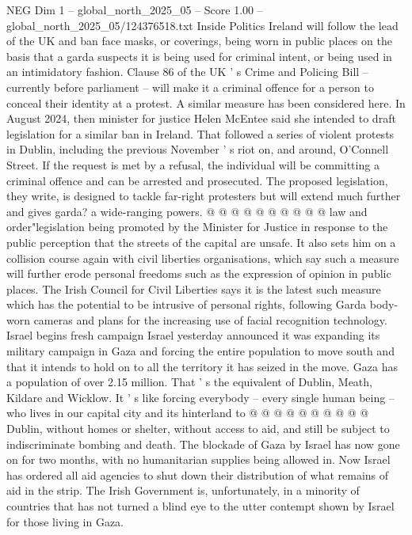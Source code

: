 \begin{textsample}{NEG Dim 1 – global\_north\_2025\_05 – Score 1.00 – global\_north\_2025\_05/124376518.txt}  \label{ex:f1_neg_086}
Inside Politics Ireland will follow the lead of the UK and ban face masks, or coverings, being worn in public places on the basis that a garda suspects it is being used for criminal intent, or being used in an intimidatory fashion.
Clause 86 of the UK ' s Crime and Policing Bill -- currently before parliament -- will make it a criminal offence for a person to conceal their identity at a protest.
A similar measure has been considered here.
In August 2024, then minister for justice Helen McEntee said she intended to draft legislation for a similar ban in Ireland.
That followed a series of violent protests in Dublin, including the previous November ' s riot on, and around, O'Connell Street.
If the request is met by a refusal, the individual will be committing a criminal offence and can be arrested and prosecuted.
The proposed legislation, they write, is designed to tackle far-right protesters but will extend much further and gives garda? a wide-ranging powers. @ @ @ @ @ @ @ @ @ @ law and order"legislation being promoted by the Minister for Justice in response to the public perception that the streets of the capital are unsafe.
It also sets him on a collision course again with civil liberties organisations, which say such a measure will further erode personal freedoms such as the expression of opinion in public places.
The Irish Council for Civil Liberties says it is the latest such measure which has the potential to be intrusive of personal rights, following Garda body-worn cameras and plans for the increasing use of facial recognition technology.
Israel begins fresh campaign Israel yesterday announced it was expanding its military campaign in Gaza and forcing the entire population to move south and that it intends to hold on to all the territory it has seized in the move.
Gaza has a population of over 2.15 million.
That ' s the equivalent of Dublin, Meath, Kildare and Wicklow.
It ' s like forcing everybody -- every single human being -- who lives in our capital city and its hinterland to @ @ @ @ @ @ @ @ @ @ Dublin, without homes or shelter, without access to aid, and still be subject to indiscriminate bombing and death.
The blockade of Gaza by Israel has now gone on for two months, with no humanitarian supplies being allowed in.
Now Israel has ordered all aid agencies to shut down their distribution of what remains of aid in the strip.
The Irish Government is, unfortunately, in a minority of countries that has not turned a blind eye to the utter contempt shown by Israel for those living in Gaza.

\end{textsample}
